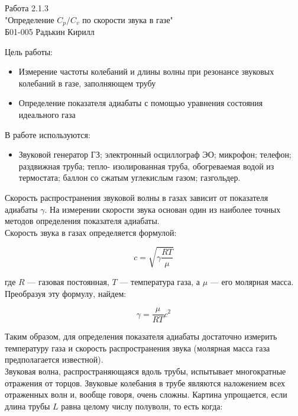 \documentclass[12pt,a4paper]{article}
\begin{document}
	\begin{center}
		Работа 2.1.3 \\
		
		"Определение $C_p / C_v$ по скорости звука в газе" \\
		
		Б01-005 Радькин Кирилл
	\end{center}
	
	Цель работы:
	
	\begin{itemize}
		\item Измерение частоты колебаний и длины волны при резонансе звуковых колебаний в газе, заполняющем трубу	
		
		\item Определение показателя адиабаты с помощью уравнения состояния идеального газа	
	\end{itemize}
	
	В работе используются: 
	\begin{itemize}
		\item Звуковой генератор ГЗ; электронный осциллограф ЭО; микрофон; телефон; раздвижная труба; тепло- изолированная труба, обогреваемая водой из термостата; баллон со сжатым углекислым газом; газгольдер.
	\end{itemize}
	
	Скорость распространения звуковой волны в газах зависит от показателя адиабаты $\gamma$. На измерении скорости звука основан один из наиболее точных методов определения показателя адиабаты. \\
	
	Скорость звука в газах определяется формулой:
	
	\begin{equation*}
		c = \sqrt{\gamma \dfrac{RT}{\mu}}
	\end{equation*}
	
	где $R$ — газовая постоянная, $T$ — температура газа, а $\mu$ — его молярная масса. Преобразуя эту формулу, найдем:
	
	\begin{equation}
		\gamma = \dfrac{\mu}{RT} c^2
	\end{equation}
	
	Таким образом, для определения показателя адиабаты достаточно измерить температуру газа и скорость распространения звука (молярная масса газа предполагается известной).\\
	
	Звуковая волна, распространяющаяся вдоль трубы, испытывает многократные отражения от торцов. Звуковые колебания в трубе являются наложением всех отраженных волн и, вообще говоря, очень сложны. Картина упрощается, если длина трубы $L$ равна целому числу полуволн, то есть когда:
	
\end{document}
